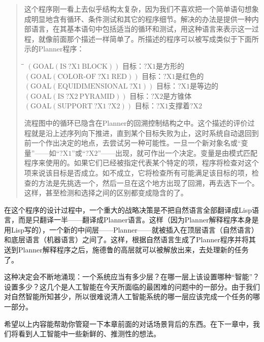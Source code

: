 \begin{quote}
这个程序刚一看上去似乎结构太复杂，因为我们不喜欢把一个简单语句想象成明显地含有循环、条件测试和其它的程序细节。解决的办法是提供一种内部语言，在其基本语句中包括适当的循环和测试，用这种语言来表示这一过程，就像前面那个描述一样简单了。所描述的程序可以被写成类似于下面所示的Planner程序：

\begin{tabbing}
\qquad\= \tabindent{-2em}\= \+\kill
$\mathrm{(GOAL(IS\ ?X1\ BLOCK))}$           \> 目标：$?\mathrm{X}1$是方形的 \\
$\mathrm{(GOAL(COLOR\text{-}OF\ ?X1\ RED))}$\> 目标：$?\mathrm{X}1$是红色的 \\
$\mathrm{(GOAL(EQUIDIMENSIONAL\ ?X1))}$     \> 目标：$?\mathrm{X}1$是等边的 \\
$\mathrm{(GOAL(IS\ ?X2\ PYRAMID))}$         \> 目标：$?\mathrm{X}2$是方锥体 \\
$\mathrm{(GOAL(SUPPORT\ ?X1\ ?X2))}$        \> 目标：$?\mathrm{X}1$支撑着$?\mathrm{X}2$
\end{tabbing}

流程图中的循环已隐含在Planner的回溯控制结构之中。这个描述的评价过程就是沿上述序列向下推进，直到某个目标失败为止，这时系统自动退回到前一个作出决定的地点，去尝试另一种可能性。一旦一个新对象名或“变量”——如“$?\mathrm{X}1$”或“$?\mathrm{X}2$”——出现，就可作出一个决定。变量是由模式匹配程序来使用的。如果它们已经被指定代表某个特定的项，程序将检查对这个项来说该目标是否成立。如不成立，它将检查所有可能满足该目标的项，检查的方法是先挑选一个，然后一旦在这个地方出现了回溯，再去选下一个。这样，甚至检测和选择之间的区别都变成隐含的了。
\end{quote}

在这个程序的设计过程中，一个重大的战略决策是不把自然语言全部翻译成Lisp语言，而是只翻译一半——翻译成Planner语言。这样（因为Planner解释程序本身是用Lisp写的），一个新的中间层——Planner——就被插入在顶层语言（自然语言）和底层语言（机器语言）之间了。这样，根据自然语言生成了Planner程序并将其送到Planner解释程序之后，施德鲁的高层就可以被解放出来，去处理新的任务了。

这种决定会不断地涌现：一个系统应当有多少层？在哪一层上该设置哪种“智能”？设置多少？这几个是人工智能在今天所面临的最困难的问题中的一部分。由于我们对自然智能所知甚少，所以很难说清人工智能系统的哪一层应该完成一个任务的哪一部分。

希望以上内容能帮助你管窥一下本章前面的对话场景背后的东西。在下一章中，我们将看到人工智能中一些新鲜的、推测性的想法。
